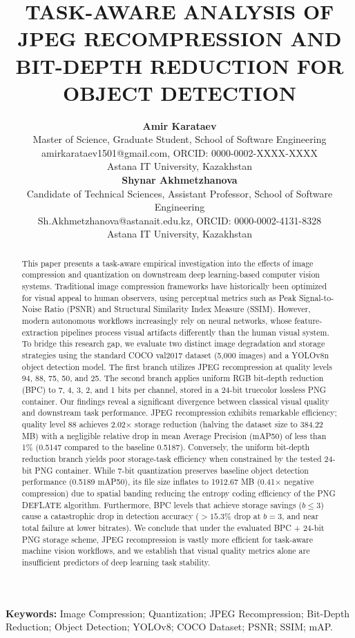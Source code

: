 \documentclass[12pt, a4paper]{article}
\title{TASK-AWARE ANALYSIS OF JPEG RECOMPRESSION AND BIT-DEPTH REDUCTION FOR OBJECT DETECTION}
\author{
  \textbf{Amir Karataev} \\
  \small Master of Science, Graduate Student, School of Software Engineering \\
  \small amirkarataev1501@gmail.com, ORCID: 0000-0002-XXXX-XXXX \\
  \small Astana IT University, Kazakhstan \\
  \textbf{Shynar Akhmetzhanova} \\
  \small Candidate of Technical Sciences, Assistant Professor, School of Software Engineering \\
  \small Sh.Akhmetzhanova@astanait.edu.kz, ORCID: 0000-0002-4131-8328 \\
  \small Astana IT University, Kazakhstan
}
\date{}
\begin{document}
\maketitle

\begin{abstract}
This paper presents a task-aware empirical investigation into the effects of image compression and quantization on downstream deep learning-based computer vision systems. Traditional image compression frameworks have historically been optimized for visual appeal to human observers, using perceptual metrics such as Peak Signal-to-Noise Ratio (PSNR) and Structural Similarity Index Measure (SSIM). However, modern autonomous workflows increasingly rely on neural networks, whose feature-extraction pipelines process visual artifacts differently than the human visual system. To bridge this research gap, we evaluate two distinct image degradation and storage strategies using the standard COCO val2017 dataset (5,000 images) and a YOLOv8n object detection model. The first branch utilizes JPEG recompression at quality levels 94, 88, 75, 50, and 25. The second branch applies uniform RGB bit-depth reduction (BPC) to 7, 4, 3, 2, and 1 bits per channel, stored in a 24-bit truecolor lossless PNG container. Our findings reveal a significant divergence between classical visual quality and downstream task performance. JPEG recompression exhibits remarkable efficiency; quality level 88 achieves 2.02$\times$ storage reduction (halving the dataset size to 384.22 MB) with a negligible relative drop in mean Average Precision (mAP50) of less than 1\% (0.5147 compared to the baseline 0.5187). Conversely, the uniform bit-depth reduction branch yields poor storage-task efficiency when constrained by the tested 24-bit PNG container. While 7-bit quantization preserves baseline object detection performance (0.5189 mAP50), its file size inflates to 1912.67 MB (0.41$\times$ negative compression) due to spatial banding reducing the entropy coding efficiency of the PNG DEFLATE algorithm. Furthermore, BPC levels that achieve storage savings ($b \le 3$) cause a catastrophic drop in detection accuracy ($>15.3\%$ drop at $b=3$, and near total failure at lower bitrates). We conclude that under the evaluated BPC + 24-bit PNG storage scheme, JPEG recompression is vastly more efficient for task-aware machine vision workflows, and we establish that visual quality metrics alone are insufficient predictors of deep learning task stability.
\end{abstract}

\noindent \textbf{Keywords:} Image Compression; Quantization; JPEG Recompression; Bit-Depth Reduction; Object Detection; YOLOv8; COCO Dataset; PSNR; SSIM; mAP.
\end{document}

